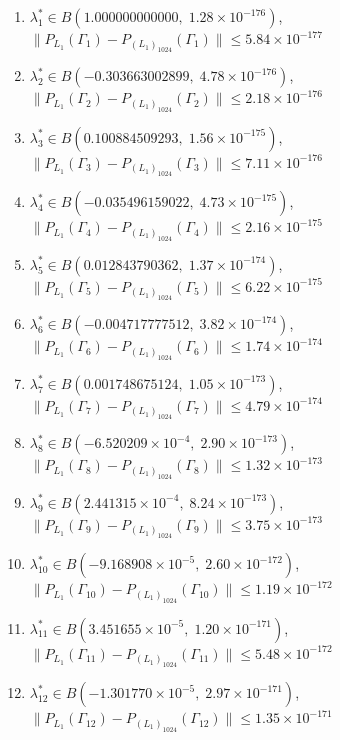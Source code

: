 
\begin{enumerate}
\item $\lambda_{1}^* \in B(1.000000000000,\; 1.28 \times 10^{-176})$, \quad $\|P_{L_1}(\Gamma_{1}) - P_{(L_1)_{1024}}(\Gamma_{1})\| \leq 5.84 \times 10^{-177}$
\item $\lambda_{2}^* \in B(-0.303663002899,\; 4.78 \times 10^{-176})$, \quad $\|P_{L_1}(\Gamma_{2}) - P_{(L_1)_{1024}}(\Gamma_{2})\| \leq 2.18 \times 10^{-176}$
\item $\lambda_{3}^* \in B(0.100884509293,\; 1.56 \times 10^{-175})$, \quad $\|P_{L_1}(\Gamma_{3}) - P_{(L_1)_{1024}}(\Gamma_{3})\| \leq 7.11 \times 10^{-176}$
\item $\lambda_{4}^* \in B(-0.035496159022,\; 4.73 \times 10^{-175})$, \quad $\|P_{L_1}(\Gamma_{4}) - P_{(L_1)_{1024}}(\Gamma_{4})\| \leq 2.16 \times 10^{-175}$
\item $\lambda_{5}^* \in B(0.012843790362,\; 1.37 \times 10^{-174})$, \quad $\|P_{L_1}(\Gamma_{5}) - P_{(L_1)_{1024}}(\Gamma_{5})\| \leq 6.22 \times 10^{-175}$
\item $\lambda_{6}^* \in B(-0.004717777512,\; 3.82 \times 10^{-174})$, \quad $\|P_{L_1}(\Gamma_{6}) - P_{(L_1)_{1024}}(\Gamma_{6})\| \leq 1.74 \times 10^{-174}$
\item $\lambda_{7}^* \in B(0.001748675124,\; 1.05 \times 10^{-173})$, \quad $\|P_{L_1}(\Gamma_{7}) - P_{(L_1)_{1024}}(\Gamma_{7})\| \leq 4.79 \times 10^{-174}$
\item $\lambda_{8}^* \in B(-6.520209 \times 10^{-4},\; 2.90 \times 10^{-173})$, \quad $\|P_{L_1}(\Gamma_{8}) - P_{(L_1)_{1024}}(\Gamma_{8})\| \leq 1.32 \times 10^{-173}$
\item $\lambda_{9}^* \in B(2.441315 \times 10^{-4},\; 8.24 \times 10^{-173})$, \quad $\|P_{L_1}(\Gamma_{9}) - P_{(L_1)_{1024}}(\Gamma_{9})\| \leq 3.75 \times 10^{-173}$
\item $\lambda_{10}^* \in B(-9.168908 \times 10^{-5},\; 2.60 \times 10^{-172})$, \quad $\|P_{L_1}(\Gamma_{10}) - P_{(L_1)_{1024}}(\Gamma_{10})\| \leq 1.19 \times 10^{-172}$
\item $\lambda_{11}^* \in B(3.451655 \times 10^{-5},\; 1.20 \times 10^{-171})$, \quad $\|P_{L_1}(\Gamma_{11}) - P_{(L_1)_{1024}}(\Gamma_{11})\| \leq 5.48 \times 10^{-172}$
\item $\lambda_{12}^* \in B(-1.301770 \times 10^{-5},\; 2.97 \times 10^{-171})$, \quad $\|P_{L_1}(\Gamma_{12}) - P_{(L_1)_{1024}}(\Gamma_{12})\| \leq 1.35 \times 10^{-171}$

\end{enumerate}
